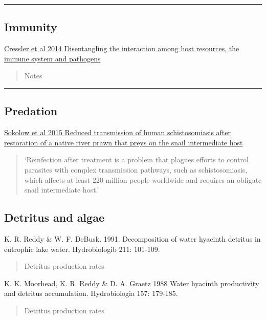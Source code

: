 \documentclass[10,portrait]{article}
\begin{document}
\begin{center}\rule{0.5\linewidth}{\linethickness}\end{center}

\subsection{Immunity}\label{immunity}

\href{https://onlinelibrary.wiley.com/doi/pdf/10.1111/ele.12229}{Cressler
et al 2014 Disentangling the interaction among host resources, the
immune system and pathogens}

\begin{quote}
Notes
\end{quote}

\newpage  

\begin{center}\rule{0.5\linewidth}{\linethickness}\end{center}

\subsection{Predation}\label{predation}

\href{http://www.pnas.org/content/pnas/early/2015/07/15/1502651112.full.pdf}{Sokolow
et al 2015 Reduced transmission of human schistosomiasis after
restoration of a native river prawn that preys on the snail intermediate
host}

\begin{quote}
`Reinfection after treatment is a problem that plagues efforts to
control parasites with complex transmission pathways, such as
schistosomiasis, which affects at least 220 million people worldwide and
requires an obligate snail intermediate host.'
\end{quote}

\begin{quote}
\end{quote}

\newpage  

\subsection{Detritus and algae}\label{detritus-and-algae}

K. R. Reddy \& W. F. DeBusk. 1991. Decomposition of water hyacinth
detritus in eutrophic lake water. Hydrobiologib 211: 101-109.

\begin{quote}
Detritus production rates
\end{quote}

K. K. Moorhead, K. R. Reddy \& D. A. Graetz 1988 Water hyacinth
productivity and detritus accumulation. Hydrobiologia 157: 179-185.

\begin{quote}
Detritus production rates
\end{quote}

\printbibliography
\end{document}
